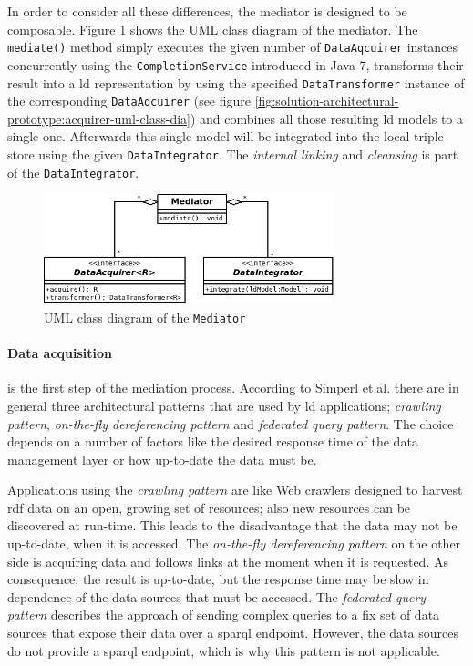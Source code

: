 \documentclass[draft,final]{vutinfth} %
\begin{document}
In order to consider all these differences, the mediator is designed to be composable. Figure \ref{fig:solution-architectural-prototype:mediator-uml-class-dia} shows the UML class diagram of the mediator. The \texttt{mediate()} method simply executes the given number of \texttt{DataAqcuirer} instances concurrently using the \texttt{CompletionService} introduced in Java 7, transforms their result into a \gls{ld} representation by using the specified \texttt{DataTransformer} instance of the corresponding \texttt{DataAqcuirer} (see figure \ref{fig:solution-architectural-prototype:acquirer-uml-class-dia}) and combines all those resulting \gls{ld} models to a single one. Afterwards this single model will be integrated into the local triple store using the given \texttt{DataIntegrator}. The \textit{internal linking} and \textit{cleansing} is part of the \texttt{DataIntegrator}.

\begin{figure}[h]
    \centering
    \includegraphics[width=0.75\textwidth]{graphics/solution/architecture/mediator.png}
    \caption{UML class diagram of the \texttt{Mediator}}
    \label{fig:solution-architectural-prototype:mediator-uml-class-dia}
\end{figure}

\paragraph{Data acquisition} is the first step of the mediation process. According to Simperl et.al.\cite{simperl_using_2013} \cite{heath_linked_2011} there are in general three architectural patterns that are used by \gls{ld} applications; \textit{crawling pattern}, \textit{on-the-fly dereferencing pattern} and \textit{federated query pattern}.  The choice depends on a number of factors like the desired response time of the data management layer or how up-to-date the data must be. 

Applications using the \textit{crawling pattern} are like Web crawlers designed to harvest \gls{rdf} data on an open, growing set of resources; also new resources can be discovered at run-time. This leads to the disadvantage that the data may not be up-to-date, when it is accessed. The \textit{on-the-fly dereferencing pattern} on the other side is acquiring data and follows links at the moment when it is requested. As consequence, the result is up-to-date, but the response time may be slow in dependence of the data sources that must be accessed. The \textit{federated query pattern} describes the approach of sending complex queries to a fix set of data sources that expose their data over a \gls{sparql} endpoint. However, the data sources do not provide a \gls{sparql} endpoint, which is why this pattern is not applicable. 
\end{document}
